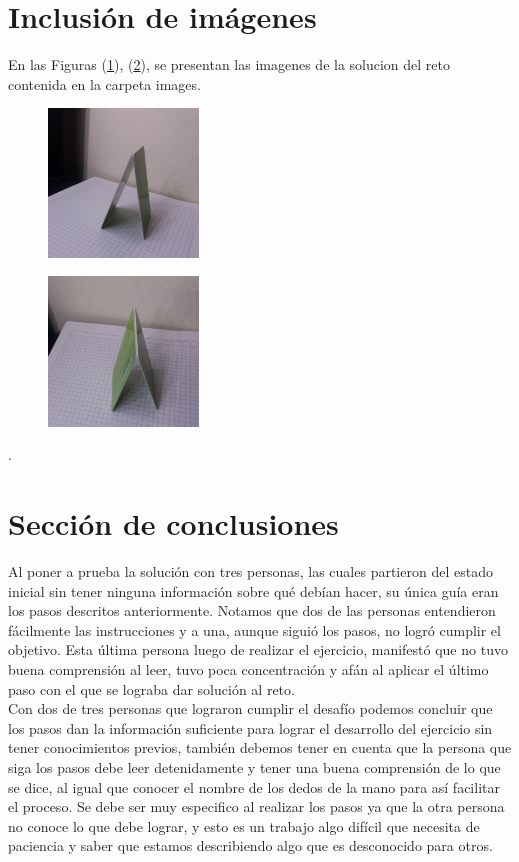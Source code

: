 \documentclass{article}
\begin{document}
\section{Inclusión de imágenes} \label{imagenes}

En las Figuras (\ref{fig:piramide1}), (\ref{fig:piramide2}), se   presentan las imagenes de la solucion del reto contenida en la carpeta images.

\begin{figure}[h]
\includegraphics[width=4cm]{piramide1.jpg}
\centering
\caption{}
\label{fig:piramide1}
\end{figure}

\begin{figure}[h]
\includegraphics[width=4cm]{piramide2.jpg}
\centering
\caption{}
\label{fig:piramide2}
\end{figure}

.
\section{Sección de conclusiones} \label{contenido}
Al poner a prueba la solución con tres personas, las cuales partieron del estado inicial sin tener ninguna información sobre qué debían hacer, su única guía eran los pasos descritos anteriormente. Notamos que dos de las personas entendieron fácilmente las instrucciones y a una, aunque siguió los pasos, no logró cumplir el objetivo. Esta última persona luego de realizar el ejercicio, manifestó que no tuvo buena comprensión al leer, tuvo poca concentración y afán al aplicar el último paso con el que se lograba dar solución al reto.\\

Con dos de tres personas que lograron cumplir el desafío podemos concluir que los pasos dan la información suficiente para lograr el desarrollo del ejercicio sin tener conocimientos previos, también debemos tener en cuenta que la persona que siga los pasos debe leer detenidamente y tener una buena comprensión de lo que se dice, al igual que conocer el nombre de los dedos de la mano para así facilitar el proceso. Se debe ser muy especifico al realizar los pasos ya que la otra persona no conoce lo que debe lograr, y esto es un trabajo algo difícil que necesita de paciencia y saber que estamos describiendo algo que es desconocido para otros.
\end{document}
